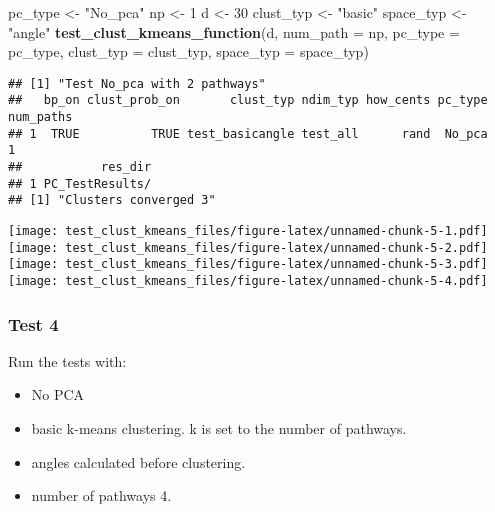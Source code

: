 \documentclass[
]{article}
\newenvironment{Shaded}{\begin{snugshade}}{\end{snugshade}}
\newcommand{\AttributeTok}[1]{\textcolor[rgb]{0.13,0.29,0.53}{#1}}
\newcommand{\DecValTok}[1]{\textcolor[rgb]{0.00,0.00,0.81}{#1}}
\newcommand{\FunctionTok}[1]{\textcolor[rgb]{0.13,0.29,0.53}{\textbf{#1}}}
\newcommand{\NormalTok}[1]{#1}
\newcommand{\OtherTok}[1]{\textcolor[rgb]{0.56,0.35,0.01}{#1}}
\newcommand{\StringTok}[1]{\textcolor[rgb]{0.31,0.60,0.02}{#1}}
\providecommand{\tightlist}{%
  \setlength{\itemsep}{0pt}\setlength{\parskip}{0pt}}
\begin{document}
\begin{Shaded}
\begin{Highlighting}[]
\NormalTok{pc\_type }\OtherTok{\textless{}{-}} \StringTok{"No\_pca"}
\NormalTok{np }\OtherTok{\textless{}{-}} \DecValTok{1}
\NormalTok{d }\OtherTok{\textless{}{-}} \DecValTok{30}
\NormalTok{clust\_typ }\OtherTok{\textless{}{-}} \StringTok{"basic"}
\NormalTok{space\_typ }\OtherTok{\textless{}{-}} \StringTok{"angle"}
\FunctionTok{test\_clust\_kmeans\_function}\NormalTok{(d,}
                           \AttributeTok{num\_path =}\NormalTok{ np,}
                           \AttributeTok{pc\_type =}\NormalTok{ pc\_type,}
                           \AttributeTok{clust\_typ =}\NormalTok{ clust\_typ,}
                           \AttributeTok{space\_typ =}\NormalTok{ space\_typ)}
\end{Highlighting}
\end{Shaded}

\begin{verbatim}
## [1] "Test No_pca with 2 pathways"
##   bp_on clust_prob_on       clust_typ ndim_typ how_cents pc_type num_paths
## 1  TRUE          TRUE test_basicangle test_all      rand  No_pca         1
##           res_dir
## 1 PC_TestResults/
## [1] "Clusters converged 3"
\end{verbatim}

\texttt{[image: test\_clust\_kmeans\_files/figure-latex/unnamed-chunk-5-1.pdf]}
\texttt{[image: test\_clust\_kmeans\_files/figure-latex/unnamed-chunk-5-2.pdf]}
\texttt{[image: test\_clust\_kmeans\_files/figure-latex/unnamed-chunk-5-3.pdf]}
\texttt{[image: test\_clust\_kmeans\_files/figure-latex/unnamed-chunk-5-4.pdf]}

\hypertarget{test-4}{%
\subsubsection{Test 4}\label{test-4}}

Run the tests with:

\begin{itemize}
\tightlist
\item
  No PCA
\item
  basic k-means clustering. k is set to the number of pathways.
\item
  angles calculated before clustering.
\item
  number of pathways 4.
\end{itemize}
\end{document}
